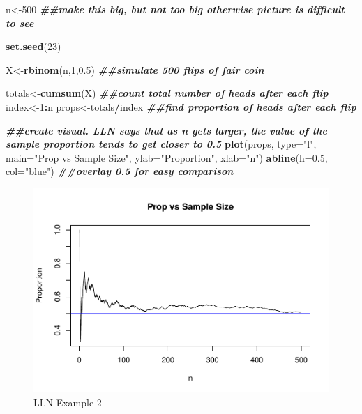 \documentclass[
]{book}
\newenvironment{Shaded}{\begin{snugshade}}{\end{snugshade}}
\newcommand{\AttributeTok}[1]{\textcolor[rgb]{0.13,0.29,0.53}{#1}}
\newcommand{\DecValTok}[1]{\textcolor[rgb]{0.00,0.00,0.81}{#1}}
\newcommand{\DocumentationTok}[1]{\textcolor[rgb]{0.56,0.35,0.01}{\textbf{\textit{#1}}}}
\newcommand{\FloatTok}[1]{\textcolor[rgb]{0.00,0.00,0.81}{#1}}
\newcommand{\FunctionTok}[1]{\textcolor[rgb]{0.13,0.29,0.53}{\textbf{#1}}}
\newcommand{\NormalTok}[1]{#1}
\newcommand{\OtherTok}[1]{\textcolor[rgb]{0.56,0.35,0.01}{#1}}
\newcommand{\SpecialCharTok}[1]{\textcolor[rgb]{0.81,0.36,0.00}{\textbf{#1}}}
\newcommand{\StringTok}[1]{\textcolor[rgb]{0.31,0.60,0.02}{#1}}
\begin{document}
\begin{Shaded}
\begin{Highlighting}[]
\NormalTok{n}\OtherTok{\textless{}{-}}\DecValTok{500} \DocumentationTok{\#\#make this big, but not too big otherwise picture is difficult to see}

\FunctionTok{set.seed}\NormalTok{(}\DecValTok{23}\NormalTok{)}

\NormalTok{X}\OtherTok{\textless{}{-}}\FunctionTok{rbinom}\NormalTok{(n,}\DecValTok{1}\NormalTok{,}\FloatTok{0.5}\NormalTok{) }\DocumentationTok{\#\#simulate 500 flips of fair coin}

\NormalTok{totals}\OtherTok{\textless{}{-}}\FunctionTok{cumsum}\NormalTok{(X) }\DocumentationTok{\#\#count total number of heads after each flip}
\NormalTok{index}\OtherTok{\textless{}{-}}\DecValTok{1}\SpecialCharTok{:}\NormalTok{n}
\NormalTok{props}\OtherTok{\textless{}{-}}\NormalTok{totals}\SpecialCharTok{/}\NormalTok{index }\DocumentationTok{\#\#find proportion of heads after each flip}

\DocumentationTok{\#\#create visual. LLN says that as n gets larger, the value of the sample proportion tends to get closer to 0.5}
\FunctionTok{plot}\NormalTok{(props, }\AttributeTok{type=}\StringTok{"l"}\NormalTok{, }\AttributeTok{main=}\StringTok{"Prop vs Sample Size"}\NormalTok{, }\AttributeTok{ylab=}\StringTok{"Proportion"}\NormalTok{, }\AttributeTok{xlab=}\StringTok{"n"}\NormalTok{)}
\FunctionTok{abline}\NormalTok{(}\AttributeTok{h=}\FloatTok{0.5}\NormalTok{, }\AttributeTok{col=}\StringTok{"blue"}\NormalTok{) }\DocumentationTok{\#\#overlay 0.5 for easy comparison}
\end{Highlighting}
\end{Shaded}

\begin{figure}
\centering
\includegraphics{bookdown-demo_files/figure-latex/4-LLN2-1.pdf}
\caption{\label{fig:4-LLN2}LLN Example 2}
\end{figure}
\end{document}
